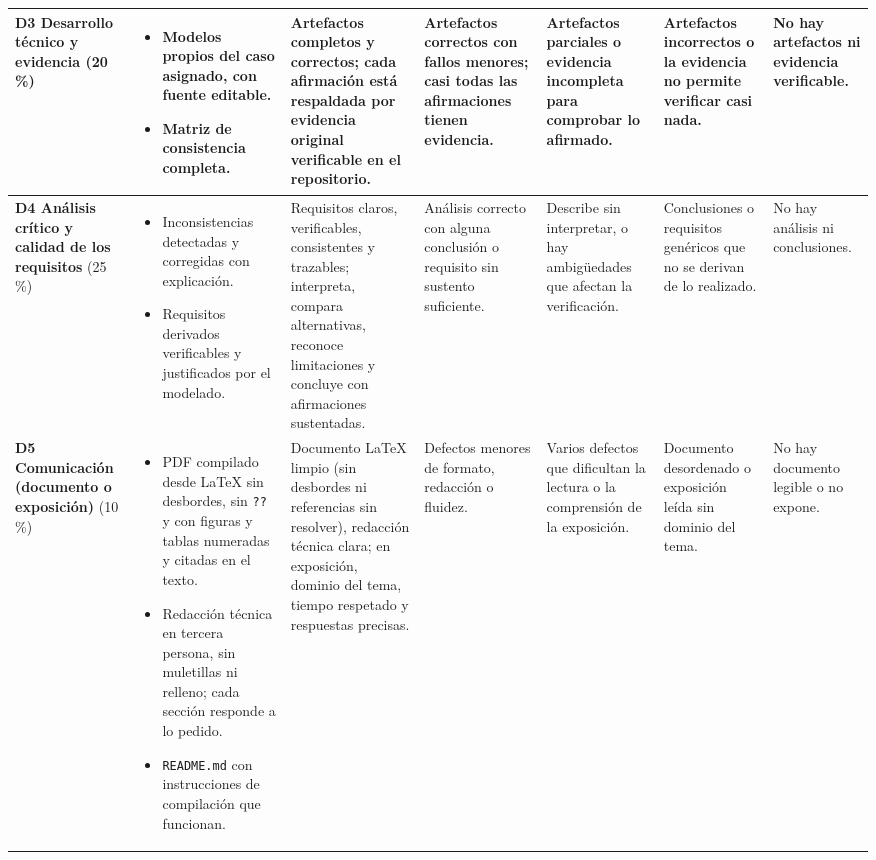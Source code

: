 \documentclass[11pt]{article}
\begin{document}
\begin{landscape}
{\begin{longtable}{|L{2.4cm}|L{5.6cm}|L{3.1cm}|L{2.8cm}|L{2.8cm}|L{2.7cm}|L{2.1cm}|}
	\hline
	\textbf{D3 Desarrollo técnico y evidencia} (20\,\%) & \begin{itemize}[leftmargin=9pt,itemsep=0pt,topsep=0pt,parsep=0pt,partopsep=0pt,after=\vspace{-\baselineskip}]\item Modelos propios del caso asignado, con fuente editable.\item Matriz de consistencia completa.\end{itemize} & Artefactos completos y correctos; cada afirmación está respaldada por evidencia original verificable en el repositorio. & Artefactos correctos con fallos menores; casi todas las afirmaciones tienen evidencia. & Artefactos parciales o evidencia incompleta para comprobar lo afirmado. & Artefactos incorrectos o la evidencia no permite verificar casi nada. & No hay artefactos ni evidencia verificable.\\
	\hline
	\textbf{D4 Análisis crítico y calidad de los requisitos} (25\,\%) & \begin{itemize}[leftmargin=9pt,itemsep=0pt,topsep=0pt,parsep=0pt,partopsep=0pt,after=\vspace{-\baselineskip}]\item Inconsistencias detectadas y corregidas con explicación.\item Requisitos derivados verificables y justificados por el modelado.\end{itemize} & Requisitos claros, verificables, consistentes y trazables; interpreta, compara alternativas, reconoce limitaciones y concluye con afirmaciones sustentadas. & Análisis correcto con alguna conclusión o requisito sin sustento suficiente. & Describe sin interpretar, o hay ambigüedades que afectan la verificación. & Conclusiones o requisitos genéricos que no se derivan de lo realizado. & No hay análisis ni conclusiones.\\
	\hline
	\textbf{D5 Comunicación (documento o exposición)} (10\,\%) & \begin{itemize}[leftmargin=9pt,itemsep=0pt,topsep=0pt,parsep=0pt,partopsep=0pt,after=\vspace{-\baselineskip}]\item PDF compilado desde \LaTeX{} sin desbordes, sin \texttt{??} y con figuras y tablas numeradas y citadas en el texto.\item Redacción técnica en tercera persona, sin muletillas ni relleno; cada sección responde a lo pedido.\item \texttt{README.md} con instrucciones de compilación que funcionan.\end{itemize} & Documento \LaTeX{} limpio (sin desbordes ni referencias sin resolver), redacción técnica clara; en exposición, dominio del tema, tiempo respetado y respuestas precisas. & Defectos menores de formato, redacción o fluidez. & Varios defectos que dificultan la lectura o la comprensión de la exposición. & Documento desordenado o exposición leída sin dominio del tema. & No hay documento legible o no expone.\\

\end{longtable}}
\end{landscape}
\end{document}
